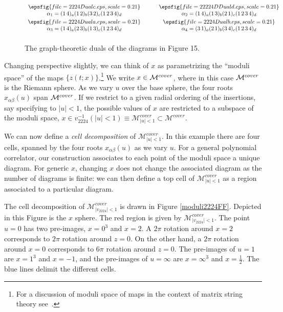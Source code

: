 \documentclass[letterpaper]{JHEP3}
\def\a{\alpha}
\def\half{{\frac12}}
\def\a{\alpha}
\def\[{\left[}
\begin{document}
\begin{figure}[htbp]
\begin{center}
$\begin{array}{c@{\hspace{0.45in}}c}
 \epsfig{file=2224Dualc.eps,scale=0.21} & \epsfig{file=22224DDuald.eps,scale=0.21}\\
\a_1=(1\,4)_a(1\,2)_b(3\,2)_c(1\,2\,3\,4)_d &
\a_2=(1\,4)_a(1\,3)_b(2\,1)_c(1\,2\,3\,4)_d \\[0.1cm]
  \epsfig{file=2224Duala.eps,scale=0.21}& \epsfig{file=2224Dualb.eps,scale=0.21}  \\
\a_3=(1\,4)_a(2\,3)_b(1\,3)_c(1\,2\,3\,4)_d&
\a_4=(3\,1)_a(2\,1)_b(3\,4)_c(1\,2\,3\,4)_d
\\ [0.2cm]
\end{array}$
\end{center}
 \begin{center}
\caption{The graph-theoretic duals of the diagrams in Figure  15.
} \label{extremDual}
\end{center}
\end{figure}

Changing perspective slightly, we can think of $x$
as parametrizing the ``moduli space''  of the maps $\{ z(t; x) \}$.\footnote{
For a discussion of moduli space of maps in the context of matrix string theory see~\cite{Bonelli:1998wx,Bonelli:1999qa}.}
 We write $x \in {\cal M}^{cover}$,
where in this case ${\cal M}^{cover}$ is the Riemann sphere.
 As we vary $u$ over the base sphere, the four roots $x_{\alpha \beta}(u)$ span
 ${\cal M}^{cover}$.
If we restrict to a given radial ordering
of the insertions, say specifying to $|u|<1$, the possible values of $x$ are restricted to a subspace of the moduli space,  $x\in v_{2224}^{-1}(|u|<1)\equiv {\mathcal M}^{cover}_{|u|<1}\subset
{\mathcal M}^{cover}$. 

We can now define a {\it cell decomposition} of ${\mathcal M}^{cover}_{|u|<1}$. In this example there are four cells,
spanned by the four roots $x_{\alpha \beta}(u)$ as we vary $u$. For a general polynomial correlator,
our construction associates to each
point of the moduli space  a unique diagram. For generic $x$,
 changing $x$ does not change the associated diagram as
the number of diagrams is finite: we can then define a top cell of  ${\mathcal M}^{cover}_{|u|<1}$ as a region associated 
to a particular diagram. 

 The cell decomposition of ${\mathcal M}^{cover}_{|v_{2224}|<1}$ is drawn in Figure \ref{moduli2224FF}.
Depicted  in this Figure is the $x$ sphere. The red region is given by ${\mathcal M}^{cover}_{|v_{2224}|<1}$.
 The point $u=0$ has two pre-images, $x=0^3$ and $x=2$. A $2\pi$ rotation around $x=2$ corresponds to $2\pi$ rotation around $z=0$. On the other hand,
a $2\pi$ rotation around $x=0$ corresponds to $6\pi$ rotation around $z=0$. The pre-images of $u=1$ are $x=1^3$ and $x=-1$, and the pre-images 
of $u=\infty$ are $x=\infty^3$ and $x=\half$.
 The blue lines delimit the different cells. 
 
\end{document}
